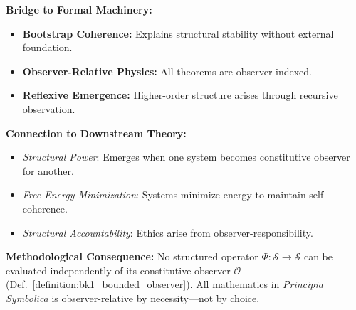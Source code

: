 \begin{tcolorbox}[breakable, title=Foundational Scholium — The Constitutive Reflex, colback=blue!5!white, colframe=blue!75!black, fonttitle=\bfseries]
\textbf{Bridge to Formal Machinery:}
\begin{itemize}
\item \textbf{Bootstrap Coherence:} Explains structural stability without external foundation.
\item \textbf{Observer-Relative Physics:} All theorems are observer-indexed.
\item \textbf{Reflexive Emergence:} Higher-order structure arises through recursive observation.
\end{itemize}

\textbf{Connection to Downstream Theory:}
\begin{itemize}
    \item \emph{Structural Power}: Emerges when one system becomes constitutive observer for another.
    \item \emph{Free Energy Minimization}: Systems minimize energy to maintain self-coherence.
    \item \emph{Structural Accountability}: Ethics arise from observer-responsibility.
\end{itemize}
\textbf{Methodological Consequence:} No structured operator $\Phi: \mathcal{S} \to \mathcal{S}$ can be evaluated independently of its constitutive observer $\mathcal{O}$ (Def.~\ref{definition:bk1_bounded_observer}). All mathematics in \emph{Principia Symbolica} is observer-relative by necessity—not by choice.

\end{tcolorbox}

